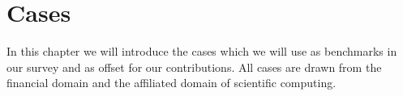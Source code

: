 \chapter{Cases}

In this chapter we will introduce the cases which we will use as
benchmarks in our survey and as offset for our contributions. All
cases are drawn from the financial domain and the affiliated domain of
scientific computing.






